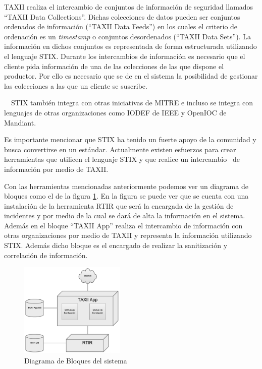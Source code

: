 \bigskip

	TAXII realiza el intercambio de conjuntos de información de seguridad llamados ``TAXII Data Collections''. Dichas
	colecciones de datos pueden ser conjuntos ordenados de información (``TAXII Data Feeds'') en los cuales el criterio de
	ordenación es un \textit{timestamp} o conjuntos desordenados (``TAXII Data Sets''). La información en dichos conjuntos
	es representada de forma estructurada utilizando el lenguaje STIX. Durante los intercambios de información es necesario
	que el cliente pida información de una de las colecciones de las que dispone el productor. Por ello es necesario que se
	de en el sistema la posibilidad de gestionar las colecciones a las que un cliente se suscribe.


\bigskip

	\ \ STIX también integra con otras iniciativas de MITRE e incluso se integra con lenguajes de otras organizaciones como
	IODEF de IEEE y OpenIOC de Mandiant.


\bigskip

	Es importante mencionar que STIX ha tenido un fuerte apoyo de la comunidad y busca convertirse en un estándar. Actualmente
	existen esfuerzos para crear herramientas que utilicen el lenguaje STIX y que realice un intercambio \ de información
	por medio de TAXII.

\bigskip

	Con las herramientas mencionadas anteriormente podemos ver un diagrama de bloques como el de la figura \ref{fig.diagramabloques}. En la figura
	se puede ver que se cuenta con una instalación de la herramienta RTIR que será la encargada de la gestión de incidentes
	y por medio de la cual se dará de alta la información en el sistema. Además en el bloque ``TAXII App'' realiza el
	intercambio de información con otras organizaciones por medio de TAXII y representa la información utilizando STIX.
	Además dicho bloque es el encargado de realizar la sanitización y correlación de información.

\begin{figure}[h!]
	\centering
	\includegraphics[width=1.9673in,height=1.7811in]{Analisis22-img/Analisis22-img016.png}
	\caption{Diagrama de Bloques del sistema}
	\label{fig.diagramabloques}
\end{figure}

